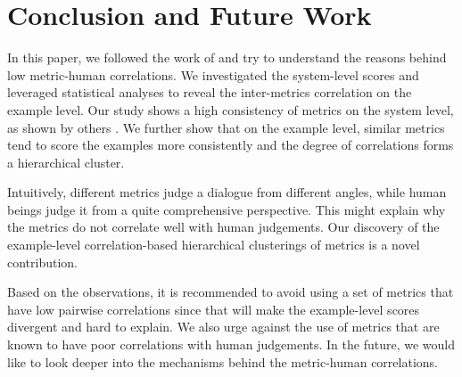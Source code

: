 \documentclass[runningheads]{llncs}
\begin{document}
    \section{Conclusion and Future Work}
    In this paper, we followed the work of \cite{HowNot} and try to understand the reasons behind low metric-human correlations. We investigated the system-level scores and leveraged statistical analyses to reveal the inter-metrics correlation on the example level. Our study shows a high consistency of metrics on the system level, as shown by others \cite{HowNot,VHRED,GoogleChatbot}. We further show that on the example level, similar metrics tend to score the examples more consistently and the degree of correlations forms a hierarchical cluster.

    Intuitively, different metrics judge a dialogue from different angles, while human beings judge it from a quite comprehensive perspective. This might explain why the metrics do not correlate well with human judgements. Our discovery of the example-level correlation-based hierarchical clusterings of metrics is a novel contribution.

    Based on the observations, it is recommended to avoid using a set of metrics that have low pairwise correlations since that will make the example-level scores divergent and hard to explain. We also urge against the use of metrics that are known to have poor correlations with human judgements. In the future, we would like to look deeper into the mechanisms behind the metric-human correlations.

    
    
\end{document}
